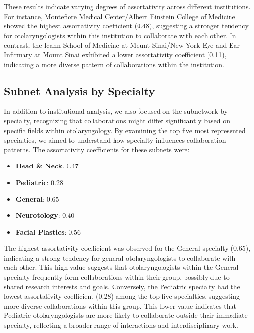 \documentclass[12pt]{article}
\begin{document}
These results indicate varying degrees of assortativity across different institutions. For instance, Montefiore Medical Center/Albert Einstein College of Medicine showed the highest assortativity coefficient (0.48), suggesting a stronger tendency for otolaryngologists within this institution to collaborate with each other. In contrast, the Icahn School of Medicine at Mount Sinai/New York Eye and Ear Infirmary at Mount Sinai exhibited a lower assortativity coefficient (0.11), indicating a more diverse pattern of collaborations within the institution.

\subsection{Subnet Analysis by Specialty}

In addition to institutional analysis, we also focused on the subnetwork by specialty, recognizing that collaborations might differ significantly based on specific fields within otolaryngology. By examining the top five most represented specialties, we aimed to understand how specialty influences collaboration patterns. The assortativity coefficients for these subnets were:

\begin{itemize}
    \item \textbf{Head \& Neck}: 0.47
    \item \textbf{Pediatric}: 0.28
    \item \textbf{General}: 0.65
    \item \textbf{Neurotology}: 0.40
    \item \textbf{Facial Plastics}: 0.56
\end{itemize}

The highest assortativity coefficient was observed for the General specialty (0.65), indicating a strong tendency for general otolaryngologists to collaborate with each other. This high value suggests that otolaryngologists within the General specialty frequently form collaborations within their group, possibly due to shared research interests and goals. Conversely, the Pediatric specialty had the lowest assortativity coefficient (0.28) among the top five specialties, suggesting more diverse collaborations within this group. This lower value indicates that Pediatric otolaryngologists are more likely to collaborate outside their immediate specialty, reflecting a broader range of interactions and interdisciplinary work.





\end{document}

